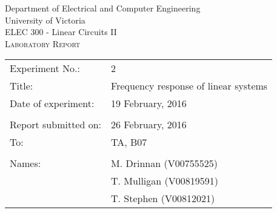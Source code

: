 \begin{center}
	\begin{LARGE}
		Department of Electrical and Computer Engineering \\
		University of Victoria \\
		ELEC 300 - Linear Circuits II \\[1cm]
		\textsc{Laboratory Report}
		\\[1cm]
	\end{LARGE}
\end{center}

\begin{tabular}{ p{} p{} }
	Experiment No.: & 2 \\ 
	Title: & Frequency response of linear systems \\ 
	Date of experiment:& 19 February, 2016 \\ 
	& \\
	Report submitted on:& 26 February, 2016 \\ 
	To: & TA, B07 \\ 
	& \\
	Names: & M. Drinnan (V00755525)\\
	& T. Mulligan (V00819591) \\
	& T. Stephen (V00812021) 
\end{tabular}

\newpage